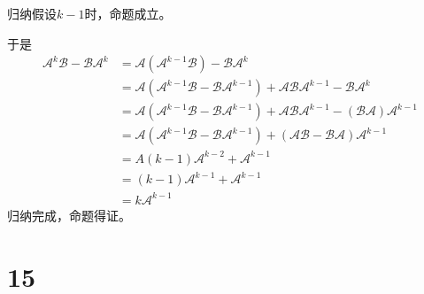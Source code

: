 \documentclass{article}
\begin{document}
归纳假设$k-1$时，命题成立。

于是
\begin{align*}
  \mathscr{A}^k \mathscr{B} - \mathscr{B}\mathscr{A}^k
   & = \mathscr{A}(\mathscr{A}^{k - 1} \mathscr{B}) - \mathscr{B}\mathscr{A}^k                                                                           \\
   & = \mathscr{A}(\mathscr{A}^{k - 1} \mathscr{B} - \mathscr{B}\mathscr{A}^{k-1}) + \mathscr{A} \mathscr{B}\mathscr{A}^{k-1}
  - \mathscr{B}\mathscr{A}^k                                                                                                                             \\
   & = \mathscr{A}(\mathscr{A}^{k - 1} \mathscr{B} - \mathscr{B}\mathscr{A}^{k-1}) + \mathscr{A} \mathscr{B}\mathscr{A}^{k-1}
  - (\mathscr{B}\mathscr{A})\mathscr{A}^{k-1}                                                                                                            \\
   & = \mathscr{A}(\mathscr{A}^{k - 1} \mathscr{B} - \mathscr{B}\mathscr{A}^{k-1}) + (\mathscr{A} \mathscr{B} - \mathscr{B}\mathscr{A})\mathscr{A}^{k-1} \\
   & = A (k-1)\mathscr{A}^{k - 2} + \mathscr{A}^{k - 1}                                                                                                  \\
   & = (k-1)\mathscr{A}^{k - 1} + \mathscr{A}^{k - 1}                                                                                                    \\
   & = k\mathscr{A}^{k - 1}
\end{align*}
归纳完成，命题得证。

\section*{15}
\end{document}
